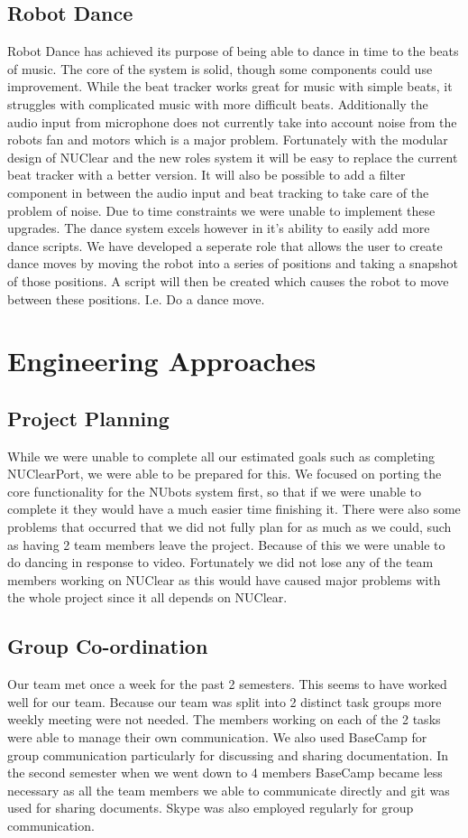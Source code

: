 \documentclass[english,12pt]{scrartcl}
\begin{document}
	\subsection{Robot Dance}
			Robot Dance has achieved its purpose of being able to dance in time to the beats of music.
			The core of the system is solid, though some components could use improvement.
			While the beat tracker works great for music with simple beats, it struggles with complicated music with more difficult beats.
			Additionally the audio input from microphone does not currently take into account noise from the robots fan and motors which is a major problem.
			Fortunately with the modular design of NUClear and the new roles system it will be easy to replace the current beat tracker with a better version.
			It will also be possible to add a filter component in between the audio input and beat tracking to take care of the problem of noise.
			Due to time constraints we were unable to implement these upgrades.
			The dance system excels however in it's ability to easily add more dance scripts. 
			We have developed a seperate role that allows the user to create dance moves by moving the robot into a series of positions and taking a snapshot of those positions. 
			A script will then be created which causes the robot to move between these positions.
			 I.e. Do a dance move.

\section{Engineering Approaches}
	\subsection{Project Planning}
		While we were unable to complete all our estimated goals such as completing NUClearPort, we were able to be prepared for this.
		We focused on porting the core functionality for the NUbots system first, so that if we were unable to complete it they would have a much easier time finishing it.
		There were also some problems that occurred that we did not fully plan for as much as we could, such as having 2 team members leave the project.
		Because of this we were unable to do dancing in response to video.
		Fortunately we did not lose any of the team members working on NUClear as this would have caused major problems with the whole project since it all depends on NUClear.
	
	\subsection{Group Co-ordination}
		Our team met once a week for the past 2 semesters. This seems to have worked well for our team.
		Because our team was split into 2 distinct task groups more weekly meeting were not needed.
		The members working on each of the 2 tasks were able to manage their own communication.
		We also used BaseCamp for group communication particularly for discussing and sharing documentation.
		In the second semester when we went down to 4 members BaseCamp became less necessary as all the team members we able to communicate directly and git was used for sharing documents.
		Skype was also employed regularly for group communication.
	
\end{document}

